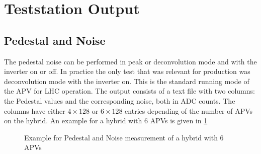 \section{Teststation Output}

\subsection{Pedestal and Noise}
The pedestal noise can be performed in peak or deconvolution mode and with the inverter on or off.
In practice the only test that was relevant for production was deconvolution mode with the inverter on.
This is the standard running mode of the APV for LHC operation.
The output consists of a text file with two columns: the Pedestal values and the corresponding noise, both in ADC counts.
The columns have either $4 \times 128$ or $6 \times 128$ entries depending of the number of APVs on the hybrid.
An example for a hybrid with 6 APVs is given in \ref{fig:ped_noise_example}
\begin{figure}[h]
  \begin{center}
    \caption{Example for Pedestal and Noise measurement of a hybrid with 6 APVs}
    \label{fig:ped_noise_example}
  \end{center}
\end{figure}


